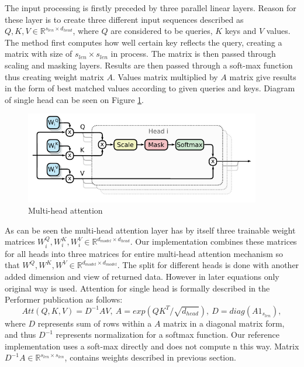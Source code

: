The input processing is firstly preceded by three parallel linear layers. Reason for these layer is to create three different input sequences described as $Q,K,V \in \mathbb{R}^{s_{len} \times d_{head}}$, where $Q$ are considered to be queries, $K$ keys and $V$ values. The method first computes how well certain key reflects the query, creating a matrix with size of $s_{len} \times s_{len}$ in process. The matrix is then passed through scaling and masking layers. Results are then passed through a soft-max function thus creating weight matrix $A$. Values matrix multiplied by $A$ matrix give results in the form of best matched values according to given queries and keys. Diagram of single head can be seen on Figure \ref{fig:multi-head}.

\begin{figure}[h]
    \centering
    \includegraphics[height=4cm, width=10.3cm]{obrazky/multi_head_attention.pdf}
    \caption{Multi-head attention}
    \label{fig:multi-head}
\end{figure}

As can be seen the multi-head attention layer has by itself three trainable weight matrices $W^Q_i, W^K_i, W^V_i \in \mathbb{R}^{d_{model} \times d_{head} }$. Our implementation combines these matrices for all heads into three matrices for entire multi-head attention mechanism so that $W^Q, W^K, W^V \in \mathbb{R}^{d_{model} \times d_{model} }$. The split for different heads is done with another added dimension and view of returned data. However in later equations only original way is used. Attention for single head is formally described in the Performer publication as follows:
\begin{equation}
    Att(Q,K,V)=D^{-1}AV,\ 
    A = exp(QK^T/\sqrt{d_{head}}),\ 
    D=diag(A1_{s_{len}}),
\end{equation}
where $D$ represents sum of rows within a $A$ matrix in a diagonal matrix form, and thus $D^{-1}$ represents normalization for a softmax function. Our reference implementation uses a soft-max directly and does not compute n this way. Matrix $D^{-1}A \in \mathbb{R}^{s_{len} \times s_{len}}$, contains weights described in previous section. 

